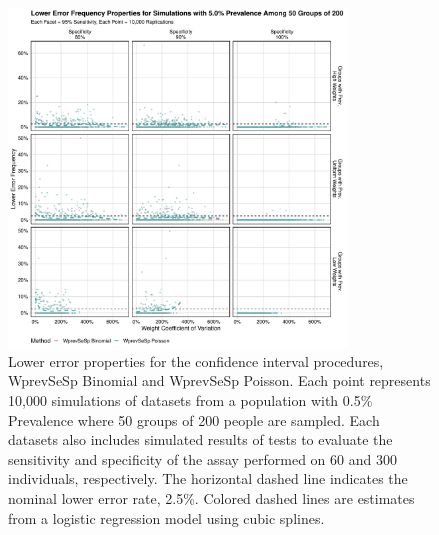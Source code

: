 \documentclass[AMA,STIX1COL]{WileyNJD-v2}
\begin{document}

\begin{figure}
\centering
\includegraphics[width=0.8\textwidth]{figures/imperfect_lower_error_frequency_50_groups_0_05_prev.pdf}
\caption{Lower error properties for the confidence interval procedures, WprevSeSp Binomial and WprevSeSp Poisson.
Each point represents 10,000 simulations of datasets from a population with 0.5\% Prevalence where 50 groups of 200 people are sampled.
Each datasets also includes simulated results of tests to evaluate the sensitivity and specificity of the assay performed on 60 and 300 individuals, respectively.
The horizontal dashed line indicates the nominal lower error rate, 2.5\%.
Colored dashed lines are estimates from a logistic regression model using cubic splines.}
\label{fig:imperfect_lower_error_frequency_50_groups_0_05_prev}
\end{figure}
\end{document}
